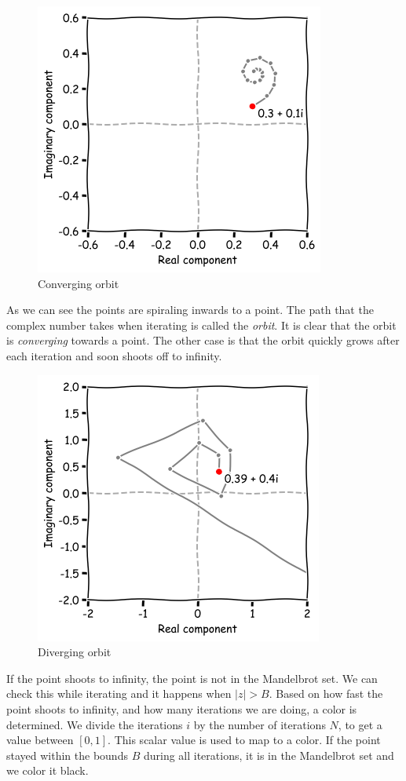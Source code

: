 \documentclass[11pt]{article}
\makeatletter
\def\maxwidth{\ifdim\Gin@nat@width>\linewidth\linewidth
    \else\Gin@nat@width\fi}
\let\Oldincludegraphics\includegraphics
\renewcommand{\includegraphics}[1]{\Oldincludegraphics[width=.8\maxwidth]{#1}}
\makeatother
\begin{document}
\begin{figure}[h]
\centering
\includegraphics{img/orbit-converging.png}
\caption{Converging orbit}

\end{figure}

    As we can see the points are spiraling inwards to a point. The path that
the complex number takes when iterating is called the \emph{orbit}. It
is clear that the orbit is \emph{converging} towards a point. The other
case is that the orbit quickly grows after each iteration and soon
shoots off to infinity.

\begin{figure}[h]
\centering
\includegraphics{img/orbit-diverging.png}
\caption{Diverging orbit}
\end{figure}

    If the point shoots to infinity, the point is not in the Mandelbrot set.
We can check this while iterating and it happens when \(|z| > B\). Based
on how fast the point shoots to infinity, and how many iterations we are
doing, a color is determined. We divide the iterations \(i\) by the
number of iterations \(N\), to get a value between \([0, 1]\). This
scalar value is used to map to a color. If the point stayed within the
bounds \(B\) during all iterations, it is in the Mandelbrot set and we
color it black.
\end{document}
